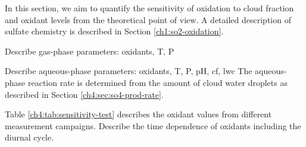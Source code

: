 In this section, we aim to quantify the sensitivity of oxidation to cloud fraction and oxidant levels from the theoretical point of view. A detailed description of sulfate chemistry is described in Section \ref{ch1:so2-oxidation}. 

Describe gas-phase parameters: oxidants, T, P

Describe aqueous-phase parameters: oxidants, T, P, pH, cf, lwc
The aqueous-phase reaction rate is determined from the amount of cloud water droplets as described in Section \ref{ch4:sec:so4-prod-rate}. 

Table \ref{ch4:tab:sensitivity-test} describes the oxidant values from different measurement campaigns. Describe the time dependence of oxidants including the diurnal cycle.

